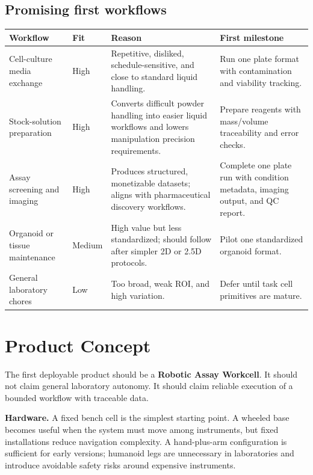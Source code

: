 \documentclass[11pt]{article}
\begin{document}
\subsection*{Promising first workflows}

{\footnotesize
\begin{tabularx}{\linewidth}{@{}>{\raggedright\arraybackslash}p{2.8cm}>{\raggedright\arraybackslash}p{1.25cm}Y>{\raggedright\arraybackslash}p{4.0cm}@{}}
\toprule
\textbf{Workflow} & \textbf{Fit} & \textbf{Reason} & \textbf{First milestone} \\
\midrule
Cell-culture media exchange & High & Repetitive, disliked, schedule-sensitive, and close to standard liquid handling. & Run one plate format with contamination and viability tracking. \\
Stock-solution preparation & High & Converts difficult powder handling into easier liquid workflows and lowers manipulation precision requirements. & Prepare reagents with mass/volume traceability and error checks. \\
Assay screening and imaging & High & Produces structured, monetizable datasets; aligns with pharmaceutical discovery workflows. & Complete one plate run with condition metadata, imaging output, and QC report. \\
Organoid or tissue maintenance & Medium & High value but less standardized; should follow after simpler 2D or 2.5D protocols. & Pilot one standardized organoid format. \\
General laboratory chores & Low & Too broad, weak ROI, and high variation. & Defer until task cell primitives are mature. \\
\bottomrule
\end{tabularx}
}

\section{Product Concept}

The first deployable product should be a \textbf{Robotic Assay Workcell}. It should not claim general laboratory autonomy. It should claim reliable execution of a bounded workflow with traceable data.

\textbf{Hardware.} A fixed bench cell is the simplest starting point. A wheeled base becomes useful when the system must move among instruments, but fixed installations reduce navigation complexity. A hand-plus-arm configuration is sufficient for early versions; humanoid legs are unnecessary in laboratories and introduce avoidable safety risks around expensive instruments.
\end{document}

